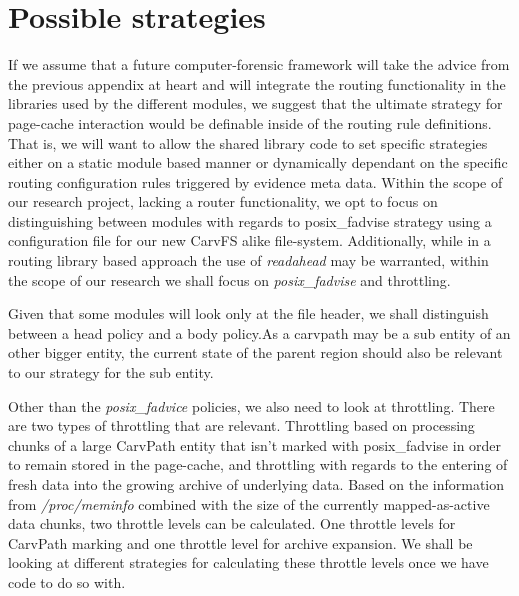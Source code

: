 \section{Possible strategies}
If we assume that a future computer-forensic framework will take the advice from the previous appendix at heart and will integrate the routing functionality in the libraries used by the different modules, we suggest that the ultimate strategy for page-cache interaction would be definable inside of the routing rule definitions. That is, we will want to allow the shared library code to set specific strategies either on a static module based manner or dynamically dependant on the specific routing configuration rules triggered by evidence meta data. Within the scope of our research project, lacking a router functionality, we opt to focus on distinguishing between modules with regards to posix\_fadvise strategy using a configuration file for our new CarvFS alike file-system. Additionally, while in a routing library based approach the use of \emph{readahead} may be warranted, within the scope of our research we shall focus on \emph{posix\_fadvise} and throttling.

Given that some modules will look only at the file header, we shall distinguish between a head policy and a body policy.As a carvpath may be a sub entity of an other bigger entity, the current state of the parent region should also be relevant to our strategy for the sub entity. 

Other than the \emph{posix\_fadvice} policies, we also need to look at throttling. 
There are two types of throttling that are relevant. Throttling based on processing chunks of a large CarvPath entity that isn't marked  with posix\_fadvise in order to remain stored in the page-cache, and throttling with regards to the entering of fresh data into the growing archive of underlying data. Based on the information from \emph{/proc/meminfo} combined with the size of the currently mapped-as-active data chunks, two throttle levels can be calculated. One throttle levels for CarvPath marking and one throttle level for archive expansion.  We shall be looking at different strategies for calculating these throttle levels once we have code to do so with. 
